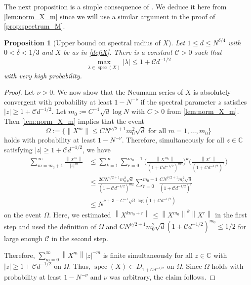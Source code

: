 \documentclass[11pt]{article}
\DeclareMathOperator{\spec}{spec}
\newcommand{\abs}[1]{\left| #1 \right|}
\newcommand{\norm}[1]{\left\| #1 \right\|}
\newcommand{\C}{\mathbb{C}}
\theoremstyle{plain}
\newtheorem{prop}{Proposition}[section]
\theoremstyle{remark}
\numberwithin{equation}{section}
\begin{document}
 
The next proposition is a simple consequence of \cite[Theorem~2.11]{BBK_spec_radii}. 
We deduce it here from \cref{lem:norm_X_m} since we will use a similar argument in the proof of \cref{prop:spectrum_M}. 

\begin{prop}[Upper bound on spectral radius of $X$] \label{prop:upper_bdd_spec_radius_X} 
Let $1\le d \le N^{\delta/4}$ with $0<\delta <1/3$ and $X$ be as in \cref{defiX}. There is a constant $\mathcal C>0$ such that 
\[ \max_{\lambda \in \spec(X)} \abs{\lambda} \leq 1 + \mathcal C d^{-1/2} \] 
with very high probability. 
\end{prop}

\begin{proof} 
Let $\nu>0$. We now show that the Neumann series of $X$ is absolutely convergent  with probability at least $1-N^{-\nu}$ if the spectral parameter $z$ satisfies $\abs{z} \geq 1 + \mathcal C d^{-1/2}$. 
Let $m_0 := C^{-1} \sqrt{d} \log N$ with $C>0$ from \cref{lem:norm_X_m}. 
Then \cref{lem:norm_X_m} implies that the event 
\[ \Omega := \bigl\{ \|{X^m}\| \leq C N^{\nu/2+1}m_0^2 \sqrt{d} \text{ for all } m = 1, \ldots, m_0 \bigr\} \] 
holds with probability at least $1-N^{-\nu}$. Therefore, simultaneously for all $z \in \C$ satisfying $\abs{z} \geq 1 + \mathcal C d^{-1/2}$, we have  
\begin{align} 
\sum_{m=m_0+1}^\infty \frac{\norm{X^m}}{\abs{z}^m} & \leq \sum_{k=1}^\infty \sum_{r=0}^{m_0-1} \bigg( \frac{\norm{X^{m_0}}}{(1 + \mathcal C d^{-1/2})^{m_0}} \bigg)^k \bigg( \frac{\norm{X^r}}{( 1+ \mathcal C d^{-1/2})^{r}}\bigg) \nonumber \\ 
& \leq \frac{2 C N^{\nu/2 +1} m_0^2 \sqrt{d}}{(1 + \mathcal C d^{-1/2})^{m_0}} \sum_{r=0}^{m_0-1} \frac{CN^{\nu/2 + 1} m_0^2 \sqrt{d}}{(1 + \mathcal C d^{-1/2})^{r}} \nonumber \\ 
& \leq N^{\nu + 3 - C^{-1} \sqrt{d} \log (1 + \mathcal C d^{-1/2})} \label{eq:bound_Neumann_series} 
\end{align} 
on the event $\Omega$.
Here, we estimated $\norm{X^{km_0 + r}} \leq \norm{X^{m_0}}^k \norm{X^r}$ in the first step 
and used the definition of $\Omega$ and $C N^{\nu/2 + 1} m_0^2 \sqrt{d} (1 + \mathcal Cd^{-1/2})^{m_0} \leq 1/2$ for large enough $\mathcal C$ in the second step. 

Therefore, $\sum_{m=0}^\infty \norm{X^m} \abs{z}^{-m}$ is finite simultaneously for all $z \in\C$ with $\abs{z} \geq 1 + \mathcal C d^{-1/2}$ on $\Omega$. Thus, $\spec(X) \subset D_{1 + \mathcal C d^{-1/2}}$ on $\Omega$. 
Since $\Omega$ holds with probability at least $1-N^{-\nu}$ and $\nu$ was arbitrary, the claim follows. 
\end{proof} 
\end{document}
